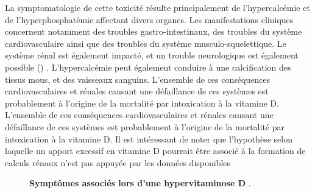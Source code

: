 \documentclass[
  a4paper,
  DIV=11,
  numbers=noendperiod,
  listof=totoc]{scrreprt}
\begin{document}
La symptomatologie de cette toxicité résulte principalement de
l'hypercalcémie et de l'hyperphosphatémie \autocites[
]{DeLuca.2011}{Janoušek.2022,Jones.2008,IOM.2011} affectant divers
organes. Les manifestations cliniques concernent notamment des troubles
gastro-intestinaux, des troubles du système cardiovasculaire ainsi que
des troubles du système musculo-squelettique. Le système rénal est
également impacté, et un trouble neurologique est également possible
() \autocites[
]{Alshahrani.2013}{Janoušek.2022}. L'hypercalcémie peut également
conduire à une calcification des tissus mous, et des vaisseaux sanguins.
L'ensemble de ces conséquences cardiovasculaires et rénales causant une
défaillance de ces systèmes est probablement à l'origine de la mortalité
par intoxication à la vitamine D. L'ensemble de ces conséquences
cardiovasculaires et rénales causant une défaillance de ces systèmes est
probablement à l'origine de la mortalité par intoxication à la vitamine
D. Il est intéressant de noter que l'hypothèse selon laquelle un apport
excessif en vitamine D pourrait être associé à la formation de calculs
rénaux n'est pas appuyée par les données disponibles \autocite{IOM.2011}

\begin{figure}


\caption[Symptômes associés lors d'une hypervitaminose
D.]{\label{fig-hypervitaminose-d}\textbf{Symptômes associés lors d'une
hypervitaminose D} \autocite{Janoušek.2022}.}

\end{figure}%
\end{document}
